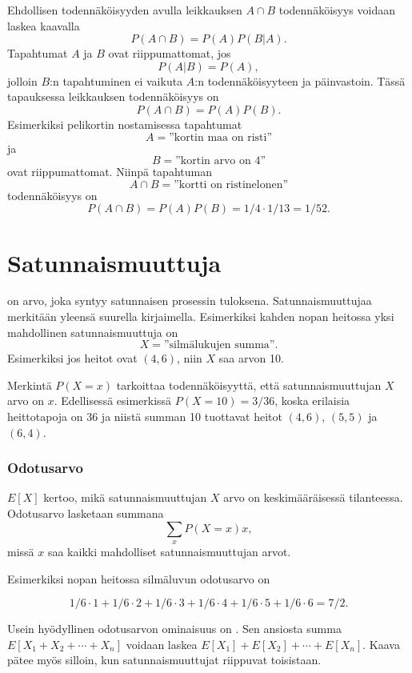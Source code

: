 
Ehdollisen todennäköisyyden avulla
leikkauksen $A \cap B$ todennäköisyys
voidaan laskea kaavalla
\[P(A \cap B)=P(A)P(B|A).\]
Tapahtumat $A$ ja $B$ ovat riippumattomat, jos
\[P(A|B)=P(A),\]
jolloin $B$:n tapahtuminen ei vaikuta $A$:n
todennäköisyyteen ja päinvastoin.
Tässä tapauksessa leikkauksen
todennäköisyys on
\[P(A \cap B)=P(A)P(B).\]
Esimerkiksi pelikortin nostamisessa
tapahtumat
\[A = \textrm{''kortin maa on risti''}\]
ja
\[B = \textrm{''kortin arvo on 4''}\]
ovat riippumattomat.
Niinpä tapahtuman
\[A \cap B = \textrm{''kortti on ristinelonen''}\]
todennäköisyys on
\[P(A \cap B)=P(A)P(B)=1/4 \cdot 1/13 = 1/52.\]

\section{Satunnaismuuttuja}


 on arvo, joka syntyy satunnaisen
prosessin tuloksena.
Satunnaismuuttujaa merkitään yleensä
suurella kirjaimella.
Esimerkiksi kahden nopan heitossa yksi mahdollinen
satunnaismuuttuja on
\[X=\textrm{''silmälukujen summa''}.\]
Esimerkiksi jos heitot ovat $(4,6)$,
niin $X$ saa arvon 10.

Merkintä $P(X=x)$ tarkoittaa todennäköisyyttä,
että satunnaismuuttujan $X$ arvo on $x$.
Edellisessä esimerkissä $P(X=10)=3/36$,
koska erilaisia heittotapoja on 36
ja niistä summan 10 tuottavat heitot
$(4,6)$, $(5,5)$ ja $(6,4)$.

\subsubsection{Odotusarvo}


 $E[X]$ kertoo, mikä satunnaismuuttujan $X$
arvo on keskimääräisessä tilanteessa.
Odotusarvo lasketaan summana
\[\sum_x P(X=x)x,\]
missä $x$ saa kaikki mahdolliset satunnaismuuttujan arvot.

Esimerkiksi nopan heitossa silmäluvun odotusarvo on

\[1/6 \cdot 1 + 1/6 \cdot 2 + 1/6 \cdot 3 + 1/6 \cdot 4 + 1/6 \cdot 5 + 1/6 \cdot 6 = 7/2.\]

Usein hyödyllinen odotusarvon ominaisuus on .
Sen ansiosta summa $E[X_1+X_2+\cdots+X_n]$ voidaan laskea $E[X_1]+E[X_2]+\cdots+E[X_n]$.
Kaava pätee myös silloin, kun satunnaismuuttujat riippuvat toisistaan.

